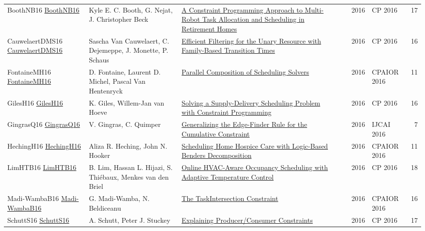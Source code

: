 {\begin{longtable}{p{3cm}p{6cm}p{7cm}rrrp{3cm}r}
BoothNB16 \href{https://doi.org/10.1007/978-3-319-44953-1\_34}{BoothNB16} & Kyle E. C. Booth, G. Nejat, J. Christopher Beck & \href{papers/BoothNB16.pdf}{A Constraint Programming Approach to Multi-Robot Task Allocation and Scheduling in Retirement Homes} &  & \cite{BoothNB16} & 2016 & CP 2016 & 17\\
CauwelaertDMS16 \href{https://doi.org/10.1007/978-3-319-44953-1\_33}{CauwelaertDMS16} & Sascha Van Cauwelaert, C. Dejemeppe, J. Monette, P. Schaus & \href{papers/CauwelaertDMS16.pdf}{Efficient Filtering for the Unary Resource with Family-Based Transition Times} &  & \cite{CauwelaertDMS16} & 2016 & CP 2016 & 16\\
FontaineMH16 \href{https://doi.org/10.1007/978-3-319-33954-2\_12}{FontaineMH16} & D. Fontaine, Laurent D. Michel, Pascal Van Hentenryck & \href{papers/FontaineMH16.pdf}{Parallel Composition of Scheduling Solvers} &  & \cite{FontaineMH16} & 2016 & CPAIOR 2016 & 11\\
GilesH16 \href{https://doi.org/10.1007/978-3-319-44953-1\_38}{GilesH16} & K. Giles, Willem{-}Jan van Hoeve & \href{papers/GilesH16.pdf}{Solving a Supply-Delivery Scheduling Problem with Constraint Programming} &  & \cite{GilesH16} & 2016 & CP 2016 & 16\\
GingrasQ16 \href{http://www.ijcai.org/Abstract/16/440}{GingrasQ16} & V. Gingras, C. Quimper & \href{}{Generalizing the Edge-Finder Rule for the Cumulative Constraint} &  & \cite{GingrasQ16} & 2016 & IJCAI 2016 & 7\\
HechingH16 \href{https://doi.org/10.1007/978-3-319-33954-2\_14}{HechingH16} & Aliza R. Heching, John N. Hooker & \href{papers/HechingH16.pdf}{Scheduling Home Hospice Care with Logic-Based Benders Decomposition} &  & \cite{HechingH16} & 2016 & CPAIOR 2016 & 11\\
LimHTB16 \href{https://doi.org/10.1007/978-3-319-44953-1\_43}{LimHTB16} & B. Lim, Hassan L. Hijazi, S. Thi{\'{e}}baux, Menkes van den Briel & \href{papers/LimHTB16.pdf}{Online HVAC-Aware Occupancy Scheduling with Adaptive Temperature Control} &  & \cite{LimHTB16} & 2016 & CP 2016 & 18\\
Madi-WambaB16 \href{https://doi.org/10.1007/978-3-319-33954-2\_18}{Madi-WambaB16} & G. Madi{-}Wamba, N. Beldiceanu & \href{papers/Madi-WambaB16.pdf}{The TaskIntersection Constraint} &  & \cite{Madi-WambaB16} & 2016 & CPAIOR 2016 & 16\\
SchuttS16 \href{https://doi.org/10.1007/978-3-319-44953-1\_28}{SchuttS16} & A. Schutt, Peter J. Stuckey & \href{papers/SchuttS16.pdf}{Explaining Producer/Consumer Constraints} &  & \cite{SchuttS16} & 2016 & CP 2016 & 17\\

\end{longtable}}
